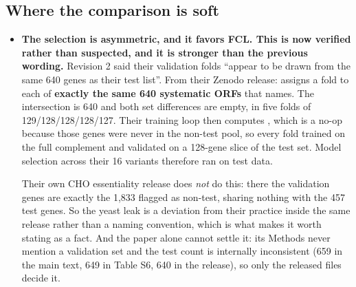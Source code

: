 \subsection{Where the comparison is soft}

\begin{itemize}
\item \textbf{The selection is asymmetric, and it favors FCL. This is now verified rather
  than suspected, and it is stronger than the previous wording.} Revision 2 said their
  validation folds ``appear to be drawn from the same 640 genes as their test list''. From
  their Zenodo release:  assigns a fold to each
  of \textbf{exactly the same 640 systematic ORFs} that
   names. The intersection is 640 and both set
  differences are empty, in five folds of 129/128/128/128/127. Their training loop then
  computes , which is a no-op
  because those genes were never in the non-test pool, so every fold trained on the full
  complement and validated on a 128-gene slice of the test set. Model selection across their
  16 variants therefore ran on test data.

  Their own CHO essentiality release does \emph{not} do this: there the validation genes are
  exactly the 1,833 flagged as non-test, sharing nothing with the 457 test genes. So the
  yeast leak is a deviation from their practice inside the same release rather than a naming
  convention, which is what makes it worth stating as a fact. And the paper alone cannot
  settle it: its Methods never mention a validation set and the test count is internally
  inconsistent (659 in the main text, 649 in Table S6, 640 in the release), so only the
  released files decide it.


\end{itemize}
